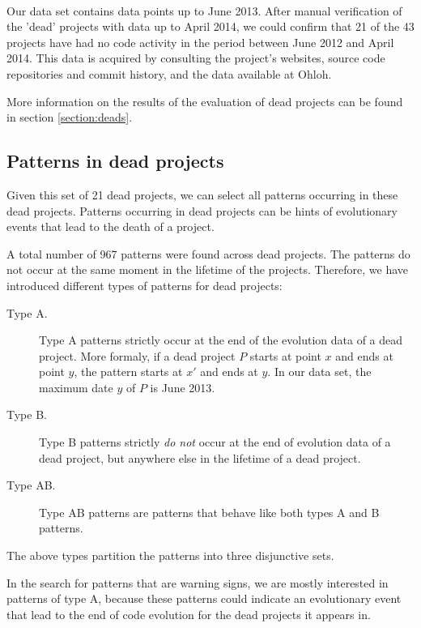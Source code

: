 \paragraph{}
Our data set contains data points up to June 2013. After manual verification of
the 'dead' projects with data up to April 2014, we could confirm that 21 of the
43 projects have had no code activity in the period between June 2012 and
April 2014. This data is acquired by consulting the project's websites, source
code repositories and commit history, and the data available at Ohloh.

More information on the results of the evaluation of dead projects can be found
in section \ref{section:deads}.

\subsection{Patterns in dead projects}
Given this set of 21 dead projects, we can select all patterns occurring in
these dead projects. Patterns occurring in dead projects can be hints of
evolutionary events that lead to the death of a project.

A total number of 967 patterns were found across dead projects. The patterns
do not occur at the same moment in the lifetime of the projects. Therefore, we
have introduced different types of patterns for dead projects:

\begin{description}
	\item[Type A.] Type A patterns strictly occur at the end of the evolution data
		of a dead project. More formaly, if a dead project $P$ starts at point $x$ and
		ends at point $y$, the pattern starts at $x'$ and ends at $y$. In our data
		set, the maximum date $y$ of $P$ is June 2013.
	
	\item[Type B.] Type B patterns strictly \emph{do not }\rm occur at the end of
		evolution data of a dead project, but anywhere else in the lifetime of a dead
		project.
	
	\item[Type AB.] Type AB patterns are patterns that behave like both types A and
		B patterns.
\end{description}

\noindent
The above types partition the patterns into three disjunctive sets.

In the search for patterns that are warning signs, we are mostly interested in
patterns of type A, because these patterns could indicate an evolutionary event
that lead to the end of code evolution for the dead projects it appears in.

